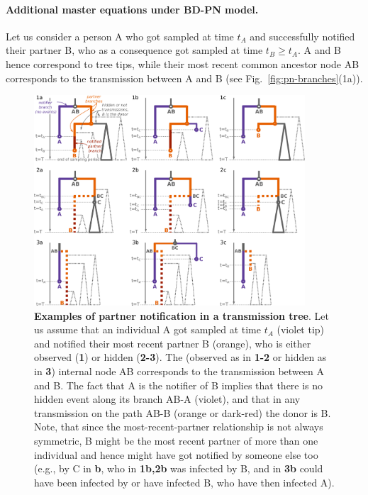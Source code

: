 \documentclass[10pt,letterpaper]{article}
\begin{document}
\paragraph{Additional master equations under BD-PN model.}

Let us consider a person A who got sampled at time $t_A$ and successfully notified their partner B, who as a consequence got sampled at time $t_B \geq t_A$. A and B hence correspond to tree tips, while their most recent common ancestor node AB corresponds to the transmission between A and B (see Fig.~\ref{fig:pn-branches}(1a)).



\begin{figure}[h!]
\centering 
\includegraphics[width=0.9\textwidth]{Fig_PNbranches}
\caption{\textbf{Examples of partner notification in a transmission tree}. Let us assume that an individual A got sampled at time $t_A$ (violet tip) and notified their most recent partner B (orange), who is either observed (\textbf{1}) or hidden (\textbf{2-3}).
The (observed as in \textbf{1-2} or hidden as in \textbf{3}) internal node AB corresponds to the transmission between A and B. 
The fact that A is the notifier of B implies that there is no hidden event along its branch AB-A (violet), and that in any transmission on the path AB-B (orange or dark-red) the donor is B. 
Note, that since the most-recent-partner relationship is not always symmetric, B might be the most recent partner of more than one individual and hence might have got notified by someone else too (e.g., by C in \textbf{b}, who in \textbf{1b,2b} was infected by B, and in \textbf{3b} could have been infected by or have infected B, who have then infected A). 
}
\end{figure}
\end{document}
